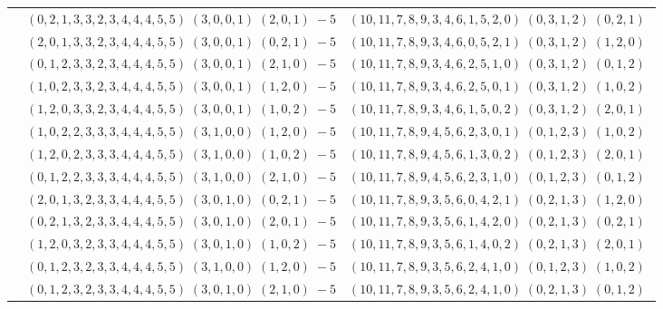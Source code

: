 \documentclass[11pt]{article}
\begin{document}
\begin{longtable}[l]{|c|c|c|}
 \cline{2-3} 
 & $(0 ,2 ,1 ,3 ,3 ,2 ,3 ,4 ,4 ,4 ,5 ,5) \;(3 ,0 ,0 ,1) \;(2 ,0 ,1) \;-5$ & $(10 ,11 ,7 ,8 ,9 ,3 ,4 ,6 ,1 ,5 ,2 ,0) \;(0 ,3 ,1 ,2) \;(0 ,2 ,1) \;$\\ 
 \cline{2-3} 
 & $(2 ,0 ,1 ,3 ,3 ,2 ,3 ,4 ,4 ,4 ,5 ,5) \;(3 ,0 ,0 ,1) \;(0 ,2 ,1) \;-5$ & $(10 ,11 ,7 ,8 ,9 ,3 ,4 ,6 ,0 ,5 ,2 ,1) \;(0 ,3 ,1 ,2) \;(1 ,2 ,0) \;$\\ 
 \cline{2-3} 
 & $(0 ,1 ,2 ,3 ,3 ,2 ,3 ,4 ,4 ,4 ,5 ,5) \;(3 ,0 ,0 ,1) \;(2 ,1 ,0) \;-5$ & $(10 ,11 ,7 ,8 ,9 ,3 ,4 ,6 ,2 ,5 ,1 ,0) \;(0 ,3 ,1 ,2) \;(0 ,1 ,2) \;$\\ 
 \cline{2-3} 
 & $(1 ,0 ,2 ,3 ,3 ,2 ,3 ,4 ,4 ,4 ,5 ,5) \;(3 ,0 ,0 ,1) \;(1 ,2 ,0) \;-5$ & $(10 ,11 ,7 ,8 ,9 ,3 ,4 ,6 ,2 ,5 ,0 ,1) \;(0 ,3 ,1 ,2) \;(1 ,0 ,2) \;$\\ 
 \cline{2-3} 
 & $(1 ,2 ,0 ,3 ,3 ,2 ,3 ,4 ,4 ,4 ,5 ,5) \;(3 ,0 ,0 ,1) \;(1 ,0 ,2) \;-5$ & $(10 ,11 ,7 ,8 ,9 ,3 ,4 ,6 ,1 ,5 ,0 ,2) \;(0 ,3 ,1 ,2) \;(2 ,0 ,1) \;$\\ 
 \cline{2-3} 
 & $(1 ,0 ,2 ,2 ,3 ,3 ,3 ,4 ,4 ,4 ,5 ,5) \;(3 ,1 ,0 ,0) \;(1 ,2 ,0) \;-5$ & $(10 ,11 ,7 ,8 ,9 ,4 ,5 ,6 ,2 ,3 ,0 ,1) \;(0 ,1 ,2 ,3) \;(1 ,0 ,2) \;$\\ 
 \cline{2-3} 
 & $(1 ,2 ,0 ,2 ,3 ,3 ,3 ,4 ,4 ,4 ,5 ,5) \;(3 ,1 ,0 ,0) \;(1 ,0 ,2) \;-5$ & $(10 ,11 ,7 ,8 ,9 ,4 ,5 ,6 ,1 ,3 ,0 ,2) \;(0 ,1 ,2 ,3) \;(2 ,0 ,1) \;$\\ 
 \cline{2-3} 
 & $(0 ,1 ,2 ,2 ,3 ,3 ,3 ,4 ,4 ,4 ,5 ,5) \;(3 ,1 ,0 ,0) \;(2 ,1 ,0) \;-5$ & $(10 ,11 ,7 ,8 ,9 ,4 ,5 ,6 ,2 ,3 ,1 ,0) \;(0 ,1 ,2 ,3) \;(0 ,1 ,2) \;$\\ 
 \cline{2-3} 
 & $(2 ,0 ,1 ,3 ,2 ,3 ,3 ,4 ,4 ,4 ,5 ,5) \;(3 ,0 ,1 ,0) \;(0 ,2 ,1) \;-5$ & $(10 ,11 ,7 ,8 ,9 ,3 ,5 ,6 ,0 ,4 ,2 ,1) \;(0 ,2 ,1 ,3) \;(1 ,2 ,0) \;$\\ 
 \cline{2-3} 
 & $(0 ,2 ,1 ,3 ,2 ,3 ,3 ,4 ,4 ,4 ,5 ,5) \;(3 ,0 ,1 ,0) \;(2 ,0 ,1) \;-5$ & $(10 ,11 ,7 ,8 ,9 ,3 ,5 ,6 ,1 ,4 ,2 ,0) \;(0 ,2 ,1 ,3) \;(0 ,2 ,1) \;$\\ 
 \cline{2-3} 
 & $(1 ,2 ,0 ,3 ,2 ,3 ,3 ,4 ,4 ,4 ,5 ,5) \;(3 ,0 ,1 ,0) \;(1 ,0 ,2) \;-5$ & $(10 ,11 ,7 ,8 ,9 ,3 ,5 ,6 ,1 ,4 ,0 ,2) \;(0 ,2 ,1 ,3) \;(2 ,0 ,1) \;$\\ 
 \cline{2-3} 
 & $(0 ,1 ,2 ,3 ,2 ,3 ,3 ,4 ,4 ,4 ,5 ,5) \;(3 ,1 ,0 ,0) \;(1 ,2 ,0) \;-5$ & $(10 ,11 ,7 ,8 ,9 ,3 ,5 ,6 ,2 ,4 ,1 ,0) \;(0 ,1 ,2 ,3) \;(1 ,0 ,2) \;$\\ 
 \cline{2-3} 
 & $(0 ,1 ,2 ,3 ,2 ,3 ,3 ,4 ,4 ,4 ,5 ,5) \;(3 ,0 ,1 ,0) \;(2 ,1 ,0) \;-5$ & $(10 ,11 ,7 ,8 ,9 ,3 ,5 ,6 ,2 ,4 ,1 ,0) \;(0 ,2 ,1 ,3) \;(0 ,1 ,2) \;$\\ 

\end{longtable}
\end{document}
